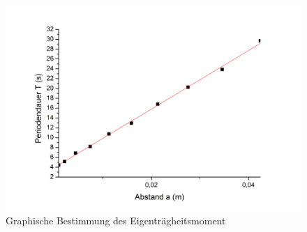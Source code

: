 	\begin{figure}[h]
		\begin{center}
		\includegraphics[scale=0.2]{eigentragmom.jpg}
		\caption{Graphische Bestimmung des Eigenträgheitsmoment}
		\label{pic:eigentragmom}
		\end{center}	
	\end{figure}